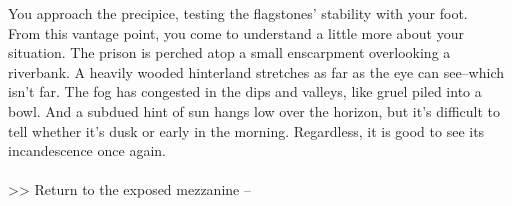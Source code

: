 You approach the precipice, testing the flagstones' stability with your foot.\\

From this vantage point, you come to understand a little more about your situation. The prison is perched atop a small enscarpment overlooking a riverbank. A heavily wooded hinterland stretches as far as the eye can see--which isn’t far. The fog has congested in the dips and valleys, like gruel piled into a bowl. And a subdued hint of sun hangs low over the horizon, but it's difficult to tell whether it's dusk or early in the morning. Regardless, it is good to see its incandescence once again.\\
\\

>> Return to the exposed mezzanine -- 